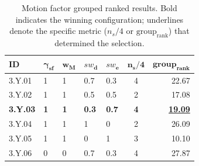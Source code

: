 \begin{table}[!t]
\centering
\footnotesize
\caption{Motion factor grouped ranked results. Bold indicates the winning configuration; underlines denote the specific metric ($n_s/4$ or $\text{group}_{\text{rank}}$) that determined the selection.}
\label{tab:motion_grouped_ranked}
\begin{tabular}{@{}lllllcr@{}}
\hline
    \textbf{ID} & $\bm{\gamma_{\text{sf}}}$ & $\bm{w_{\text{M}}}$ & $\bm{\mathit{sw}_{\text{d}}}$ & $\bm{\mathit{sw}_{\text{e}}}$ & $\bm{n_s/4}$ & $\bm{\text{group}_{\text{rank}}}$ \\
\hline
    3.Y.01 & 1 & 1 & 0.7 & 0.3 & 4 & 22.67 \\
    3.Y.02 & 1 & 1 & 0.5 & 0.5 & 2 & 17.08 \\
    \textbf{3.Y.03} & \textbf{1} & \textbf{1} & \textbf{0.3} & \textbf{0.7} & \textbf{4} & \textbf{\underline{19.09}} \\
    3.Y.04 & 1 & 1 & 1 & 0 & 2 & 26.09 \\
    3.Y.05 & 1 & 1 & 0 & 1 & 3 & 10.10 \\
    3.Y.06 & 0 & 0 & 0.7 & 0.3 & 4 & 27.87 \\
\hline
\end{tabular}
\end{table}